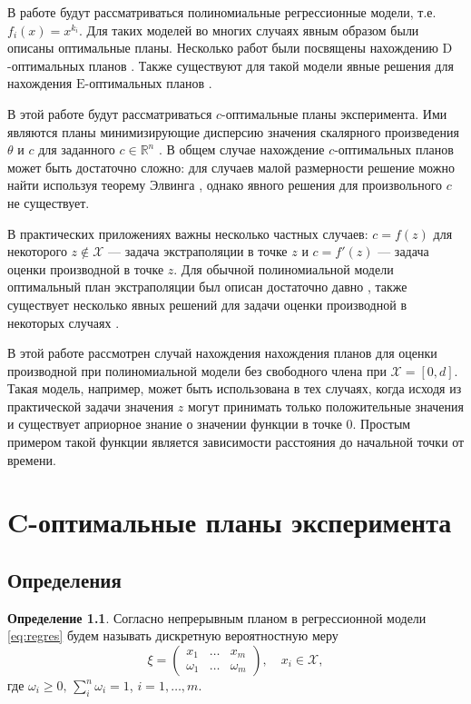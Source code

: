 \documentclass[specialist,
               substylefile = spbu.rtx,
               subf,href,colorlinks=true, 12pt]{disser}
\theoremstyle{definition}
\newtheorem{definition}{Определение}
\begin{document}
  В работе будут рассматриваться полиномиальные регрессионные модели, т.е. $f_i(x) = x^{k_i}$. Для таких моделей во многих случаях явным образом были описаны оптимальные планы. Несколько работ были посвящены нахождению $\mathrm{D}$-оптимальных планов \cite{hoel1958, studden1980, dette1990, dette2001}. Также существуют для такой модели явные решения для нахождения $\mathrm{E}$-оптимальных планов \cite{pukelsheim1993, dette1993, heiligers1994, dette1993_2}.
  
  В этой работе будут рассматриваться $c$-оптимальные планы эксперимента. Ими являются планы минимизирующие дисперсию значения скалярного произведения $\theta$ и $c$ для заданного $c \in \mathbb{R}^n$ \cite{dette1993_2}. В общем случае нахождение $c$-оптимальных планов может быть достаточно сложно: для случаев малой размерности решение можно найти используя теорему Элвинга \cite{elfving1952}, однако явного решения для произвольного $c$ не существует.
  
  В практических приложениях важны несколько частных случаев: $c = f(z)$ для некоторого $z \notin \mathcal{X}$ --- задача экстраполяции в точке $z$ и $c = f'(z)$ --- задача оценки производной в точке $z$. Для обычной полиномиальной модели оптимальный план экстраполяции был описан достаточно давно \cite{hoel1964}, также существует несколько явных решений для задачи оценки производной в некоторых случаях \cite{melas2010, melasmain}.
  
  В этой работе рассмотрен случай нахождения нахождения планов для оценки производной при полиномиальной модели без свободного члена при $\mathcal{X} = [0, d]$. Такая модель, например, может быть использована в тех случаях, когда исходя из практической задачи значения $z$ могут принимать только положительные значения и существует априорное знание о значении функции в точке 0. Простым примером такой функции является зависимости расстояния до начальной точки от времени.
  
  
  

\chapter{C-оптимальные планы эксперимента}

\section{Определения}

  \begin{definition}
  Согласно \cite{kiefer1974} непрерывным планом в регрессионной модели \eqref{eq:regres} будем называть дискретную вероятностную меру
  \begin{equation*}
    \xi = 
      \begin{pmatrix}
        x_1 & \ldots & x_m \\
        \omega_1 & \ldots & \omega_m
      \end{pmatrix}, \quad x_i \in \mathcal{X},
  \end{equation*}
   где $\omega_i \geqslant 0, \, \sum_i^n \omega_i = 1$, $i = 1, \ldots, m$.
  \end{definition}
\end{document}
